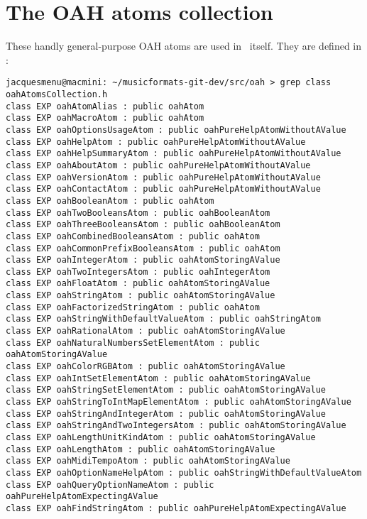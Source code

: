 
\chapter{The OAH atoms collection}\label{The OAH atoms collection}

These handly general-purpose OAH atoms are used in \mf\ itself. They are defined in :
\begin{lstlisting}[language=Terminal]
jacquesmenu@macmini: ~/musicformats-git-dev/src/oah > grep class   oahAtomsCollection.h
class EXP oahAtomAlias : public oahAtom
class EXP oahMacroAtom : public oahAtom
class EXP oahOptionsUsageAtom : public oahPureHelpAtomWithoutAValue
class EXP oahHelpAtom : public oahPureHelpAtomWithoutAValue
class EXP oahHelpSummaryAtom : public oahPureHelpAtomWithoutAValue
class EXP oahAboutAtom : public oahPureHelpAtomWithoutAValue
class EXP oahVersionAtom : public oahPureHelpAtomWithoutAValue
class EXP oahContactAtom : public oahPureHelpAtomWithoutAValue
class EXP oahBooleanAtom : public oahAtom
class EXP oahTwoBooleansAtom : public oahBooleanAtom
class EXP oahThreeBooleansAtom : public oahBooleanAtom
class EXP oahCombinedBooleansAtom : public oahAtom
class EXP oahCommonPrefixBooleansAtom : public oahAtom
class EXP oahIntegerAtom : public oahAtomStoringAValue
class EXP oahTwoIntegersAtom : public oahIntegerAtom
class EXP oahFloatAtom : public oahAtomStoringAValue
class EXP oahStringAtom : public oahAtomStoringAValue
class EXP oahFactorizedStringAtom : public oahAtom
class EXP oahStringWithDefaultValueAtom : public oahStringAtom
class EXP oahRationalAtom : public oahAtomStoringAValue
class EXP oahNaturalNumbersSetElementAtom : public oahAtomStoringAValue
class EXP oahColorRGBAtom : public oahAtomStoringAValue
class EXP oahIntSetElementAtom : public oahAtomStoringAValue
class EXP oahStringSetElementAtom : public oahAtomStoringAValue
class EXP oahStringToIntMapElementAtom : public oahAtomStoringAValue
class EXP oahStringAndIntegerAtom : public oahAtomStoringAValue
class EXP oahStringAndTwoIntegersAtom : public oahAtomStoringAValue
class EXP oahLengthUnitKindAtom : public oahAtomStoringAValue
class EXP oahLengthAtom : public oahAtomStoringAValue
class EXP oahMidiTempoAtom : public oahAtomStoringAValue
class EXP oahOptionNameHelpAtom : public oahStringWithDefaultValueAtom
class EXP oahQueryOptionNameAtom : public oahPureHelpAtomExpectingAValue
class EXP oahFindStringAtom : public oahPureHelpAtomExpectingAValue
\end{lstlisting}


